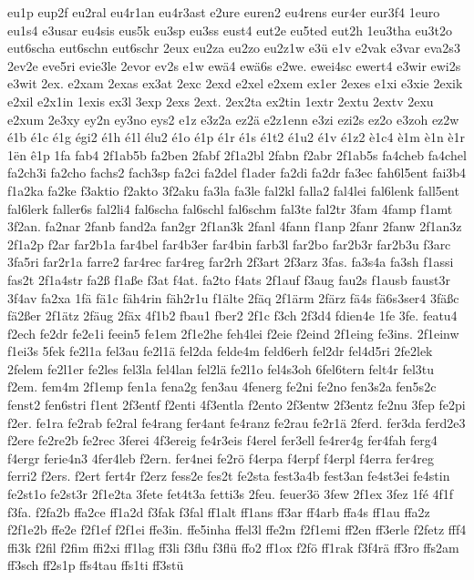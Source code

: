 {eu1p
eup2f
eu2ral
eu4r1an
eu4r3ast
e2ure
euren2
eu4rens
eur4er
eur3f4
1euro
eu1s4
e3usar
eu4sis
eus5k
eu3sp
eu3ss
eust4
eut2e
eu5ted
eut2h
1eu3tha
eu3t2o
eut6scha
eut6schn
eut6schr
2eux
eu2za
eu2zo
eu2z1w
e3ü
e1v
e2vak
e3var
eva2s3
2ev2e
eve5ri
evie3le
2evor
ev2s
e1w
ewä4
ewä6s
e2we.
ewei4sc
ewert4
e3wir
ewi2s
e3wit
2ex.
e2xam
2exas
ex3at
2exc
2exd
e2xel
e2xem
ex1er
2exes
e1xi
e3xie
2exik
e2xil
e2x1in
1exis
ex3l
3exp
2exs
2ext.
2ex2ta
ex2tin
1extr
2extu
2extv
2exu
e2xum
2e3xy
ey2n
ey3no
eys2
e1z
e3z2a
ez2ä
e2z1enn
e3zi
ezi2s
ez2o
e3zoh
ez2w
é1b
é1c
é1g
égi2
é1h
é1l
élu2
é1o
é1p
é1r
é1s
é1t2
é1u2
é1v
é1z2
è1c4
è1m
è1n
è1r
1ën
ê1p
1fa
fab4
2f1ab5b
fa2ben
2fabf
2f1a2bl
2fabn
f2abr
2f1ab5s
fa4cheb
fa4chel
fa2ch3i
fa2cho
fachs2
fach3sp
fa2ci
fa2del
f1ader
fa2di
fa2dr
fa3ec
fah6l5ent
fai3b4
f1a2ka
fa2ke
f3aktio
f2akto
3f2aku
fa3la
fa3le
fal2kl
falla2
fal4lei
fal6lenk
fall5ent
fal6lerk
faller6s
fal2li4
fal6scha
fal6schl
fal6schm
fal3te
fal2tr
3fam
4famp
f1amt
3f2an.
fa2nar
2fanb
fand2a
fan2gr
2f1an3k
2fanl
4fann
f1anp
2fanr
2fanw
2f1an3z
2f1a2p
f2ar
far2b1a
far4bel
far4b3er
far4bin
farb3l
far2bo
far2b3r
far2b3u
f3arc
3fa5ri
far2r1a
farre2
far4rec
far4reg
far2rh
2f3art
2f3arz
3fas.
fa3s4a
fa3sh
f1assi
fas2t
2f1a4str
fa2ß
f1aße
f3at
f4at.
fa2to
f4ats
2f1auf
f3aug
fau2s
f1ausb
faust3r
3f4av
fa2xa
1fä
fä1c
fäh4rin
fäh2r1u
f1älte
2fäq
2f1ärm
2färz
fä4s
fä6s3ser4
3fäßc
fä2ßer
2f1ätz
2fäug
2fäx
4f1b2
fbau1
fber2
2f1c
f3ch
2f3d4
fdien4e
1fe
3fe.
featu4
f2ech
fe2dr
fe2e1i
feein5
fe1em
2f1e2he
feh4lei
f2eie
f2eind
2f1eing
fe3ins.
2f1einw
f1ei3s
5fek
fe2l1a
fel3au
fe2l1ä
fel2da
felde4m
feld6erh
fel2dr
fel4d5ri
2fe2lek
2felem
fe2l1er
fe2les
fel3la
fel4lan
fel2lä
fe2l1o
fel4s3oh
6fel6tern
felt4r
fel3tu
f2em.
fem4m
2f1emp
fen1a
fena2g
fen3au
4fenerg
fe2ni
fe2no
fen3s2a
fen5s2c
fenst2
fen6stri
f1ent
2f3entf
f2enti
4f3entla
f2ento
2f3entw
2f3entz
fe2nu
3fep
fe2pi
f2er.
fe1ra
fe2rab
fe2ral
fe4rang
fer4ant
fe4ranz
fe2rau
fe2r1ä
2ferd.
fer3da
ferd2e3
f2ere
fe2re2b
fe2rec
3ferei
4f3ereig
fe4r3eis
f4erel
fer3ell
fe4rer4g
fer4fah
ferg4
f4ergr
ferie4n3
4fer4leb
f2ern.
fer4nei
fe2rö
f4erpa
f4erpf
f4erpl
f4erra
fer4reg
ferri2
f2ers.
f2ert
fert4r
f2erz
fess2e
fes2t
fe2sta
fest3a4b
fest3an
fe4st3ei
fe4stin
fe2st1o
fe2st3r
2f1e2ta
3fete
fet4t3a
fetti3s
2feu.
feuer3ö
3few
2f1ex
3fez
1fé
4f1f
f3fa.
f2fa2b
ffa2ce
ff1a2d
f3fak
f3fal
ff1alt
ff1ans
ff3ar
ff4arb
ffa4s
ff1au
ffa2z
f2f1e2b
ffe2e
f2f1ef
f2f1ei
ffe3in.
ffe5inha
ffel3l
ffe2m
f2f1emi
ff2en
ff3erle
f2fetz
fff4
ffi3k
f2fil
f2fim
ffi2xi
ff1lag
ff3li
f3flu
f3flü
ffo2
ff1ox
f2fö
ff1rak
f3f4rä
ff3ro
ffs2am
ff3sch
ff2s1p
ffs4tau
ffs1ti
ff3stü
}
